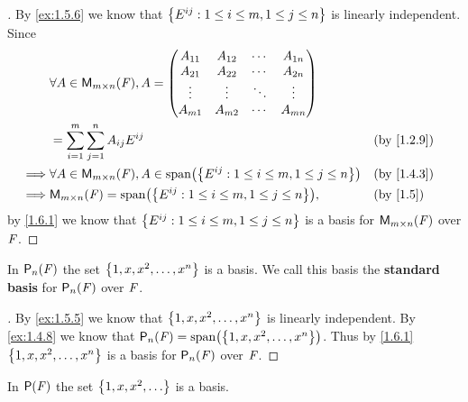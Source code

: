 \begin{proof}[]
  By \cref{ex:1.5.6} we know that \(\left\lbrace E^{i j} : 1 \leq i \leq m, 1 \leq j \leq n\right\rbrace\) is linearly independent.
  Since
  \begin{align*}
             & \forall A \in \MS, A = \begin{pmatrix}
      A_{1 1} & A_{1 2} & \cdots & A_{1 n} \\
      A_{2 1} & A_{2 2} & \cdots & A_{2 n} \\
      \vdots  & \vdots  & \ddots & \vdots  \\
      A_{m 1} & A_{m 2} & \cdots & A_{m n}
    \end{pmatrix}                                                              \\
             & = \sum_{i = 1}^m \sum_{j = 1}^n A_{i j} E^{i j}                                 &  & \text{(by \cref{1.2.9})} \\
    \implies & \forall A \in \MS, A \in \spn{\set{E^{i j} : 1 \leq i \leq m, 1 \leq j \leq n}} &  & \text{(by \cref{1.4.3})} \\
    \implies & \MS = \spn{\set{E^{i j} : 1 \leq i \leq m, 1 \leq j \leq n}},                   &  & \text{(by \cref{1.5})}
  \end{align*}
  by \cref{1.6.1} we know that \(\left\lbrace E^{i j} : 1 \leq i \leq m, 1 \leq j \leq n\right\rbrace\) is a basis for \(\mathsf{M}_{{m} \times n}({\mathit{F}})\) over \(\mathit{F}\).
\end{proof}

\begin{eg}\label{1.6.5}
  In \(\ps[n]{\F}\) the set \(\left\lbrace1, x, x^2, \dots, x^n\right\rbrace\) is a basis.
  We call this basis the \textbf{standard basis} for \(\ps[n]{\F}\) over \(\mathit{F}\).
\end{eg}

\begin{proof}[]
  By \cref{ex:1.5.5} we know that \(\left\lbrace1, x, x^2, \dots, x^n\right\rbrace\) is linearly independent.
  By \cref{ex:1.4.8} we know that \(\ps[n]{\F} = \spn{\set{1, x, x^2, \dots, x^n}}\).
  Thus by \cref{1.6.1} \(\left\lbrace1, x, x^2, \dots, x^n\right\rbrace\) is a basis for \(\ps[n]{\F}\) over \(\mathit{F}\).
\end{proof}

\begin{eg}\label{1.6.6}
  In \(\ps{\F}\) the set \(\set{1, x, x^2, \dots}\) is a basis.
\end{eg}

